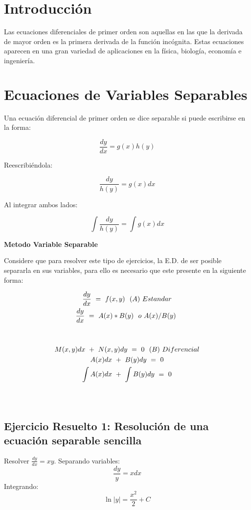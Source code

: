 \section{Introducción}
Las ecuaciones diferenciales de primer orden son aquellas en las que la derivada de mayor orden es la primera derivada de la función incógnita. Estas ecuaciones aparecen en una gran variedad de aplicaciones en la física, biología, economía e ingeniería.

\section{Ecuaciones de Variables Separables}
Una ecuación diferencial de primer orden se dice separable si puede escribirse en la forma:

\begin{equation}
\frac{dy}{dx} = g(x)h(y)
\end{equation}

Reescribiéndola:

\begin{equation}
\frac{dy}{h(y)} = g(x)dx
\end{equation}

Al integrar ambos lados:

\begin{equation}
\int \frac{dy}{h(y)} = \int g(x)dx
\end{equation}

\textbf{Metodo Variable Separable}

Considere que para resolver este tipo de ejercicios, la E.D. de ser posible separarla en sus variables, para ello es necesario que este presente en la siguiente forma:


\begin{gather}
\frac{dy}{dx} \ =\ f( x,y) \ \ ( A) \ Estandar\\
\frac{dy}{dx} \ =\ A( x) *B( y) \ \ o\ A( x) /B( y) \  \notag\\
 \notag\\
 \notag\\
M( x,y) dx\ +\ N( x,y) dy\ =\ 0\ \ ( B) \ Diferencial\\
A( x) dx\ +\ B( y) dy\ =\ 0 \notag\\
\int A( x) dx\ +\ \int B( y) dy\ =\ 0 \notag\\
 \notag\\
 \notag
\end{gather}

\subsection{Ejercicio Resuelto 1: Resolución de una ecuación separable sencilla}
Resolver \( \frac{dy}{dx} = x y \).
Separando variables:
\begin{equation}
\frac{dy}{y} = x dx
\end{equation}
Integrando:
\begin{equation}
\ln |y| = \frac{x^2}{2} + C
\end{equation}

